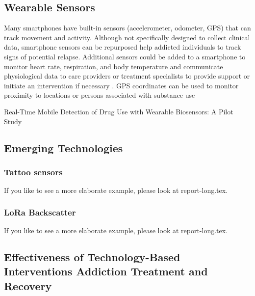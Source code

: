 \documentclass[sigconf]{acmart}
\begin{document}
\subsection{Wearable Sensors}

Many smartphones have built-in sensors (accelerometer, odometer, GPS) that can 
track movement and activity. Although not specifically designed to collect
clinical data, smartphone sensors can be repurposed help addicted individuals 
to track signs of  potential relapse. Additional sensors could be added to a 
smartphone to monitor heart rate, respiration, and body temperature and 
communicate physiological data to care providers or treatment specialists to
provide support or initiate an intervention if necessary \cite{johnson11}. 
GPS coordinates can be used to monitor proximity to locations or persons 
associated with substance use


Real-Time Mobile Detection of Drug Use with Wearable Biosensors:
A Pilot Study
\cite{carreiro15}

\subsection{Emerging Technologies}

\subsubsection{Tattoo sensors}

If you like to see a more elaborate example, please look at
report-long.tex. 


\subsubsection{LoRa Backscatter}

If you like to see a more elaborate example, please look at
report-long.tex. 


\subsection{Effectiveness of Technology-Based Interventions Addiction Treatment and Recovery}
\end{document}
